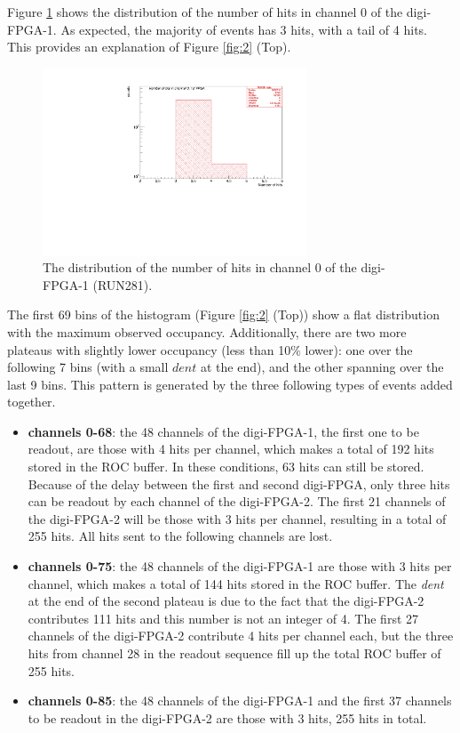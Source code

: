 Figure \ref{fig:66} shows the distribution of the number of 
hits in channel 0 of the digi-FPGA-1. As expected, 
the majority of events 
has 3 hits, with a tail of 4 hits. 
This provides an explanation of Figure \ref{fig:2} (Top).
\begin{figure}[!h]
\centering
\includegraphics[width =0.7\textwidth]{figures/pdf/figure_00066_nhits_ch00_run281.pdf}
\caption[The distribution of the number of hits in channel 0.]{
  The distribution of the number of hits in channel 
  0 of the digi-FPGA-1 (RUN281).
}
\label{fig:66}
\end{figure}
The first 69 bins of the histogram (Figure \ref{fig:2} (Top)) 
show a flat distribution with the maximum observed occupancy. 
Additionally, there are two more plateaus with slightly lower 
occupancy (less than 10\% lower): one over the following 
7 bins (with a small $dent$ at the end), and the other 
spanning over the last 9 bins.
This pattern is generated by the three following types of events added together.
\begin{itemize}
  \item \textbf{channels 0-68}: 
  the 48 channels of the digi-FPGA-1, the first one to be readout, 
  are those with 4 hits per channel, 
  which makes a total of 192 hits stored in the ROC buffer. 
  In these conditions, 63 hits can still be stored.
  Because of the delay between the first and second digi-FPGA, 
  only three hits can be readout by each channel 
  of the digi-FPGA-2. The first 21 channels of the 
  digi-FPGA-2 will be those with 3 hits per channel, resulting in a 
  total of 255 hits. All hits sent to the following 
  channels are lost.
  \item \textbf{channels 0-75}: 
  the 48 channels of the digi-FPGA-1 are 
  those with 3 hits per channel, 
  which makes a total of 144 hits stored in the ROC buffer.
  The \textit{dent} at the end of the second 
  plateau is due to the 
  fact that the digi-FPGA-2 contributes 111 hits and this number 
  is not an integer of 4. 
  The first 27 channels of the digi-FPGA-2 contribute
  4 hits per channel each, but 
  the three hits from channel 28 in the 
  readout sequence
  fill up the total ROC buffer of 255 hits. 
  \item \textbf{channels 0-85}: 
  the 48 channels of the digi-FPGA-1 and the 
  first 37 channels to be readout in the digi-FPGA-2 
  are those with 3 hits, 255 hits in total.

\end{itemize}
